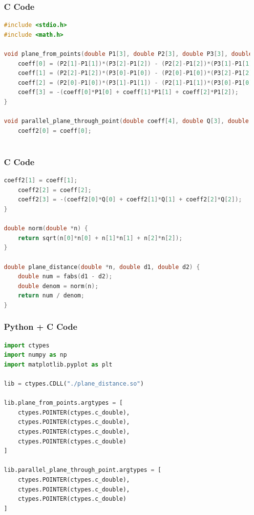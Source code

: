 \documentclass{beamer}
\begin{document}
\begin{frame}[fragile]
    \frametitle{C Code }
    \begin{lstlisting}[language=C]
#include <stdio.h>
#include <math.h>

void plane_from_points(double P1[3], double P2[3], double P3[3], double coeff[4]) {
    coeff[0] = (P2[1]-P1[1])*(P3[2]-P1[2]) - (P2[2]-P1[2])*(P3[1]-P1[1]);
    coeff[1] = (P2[2]-P1[2])*(P3[0]-P1[0]) - (P2[0]-P1[0])*(P3[2]-P1[2]);
    coeff[2] = (P2[0]-P1[0])*(P3[1]-P1[1]) - (P2[1]-P1[1])*(P3[0]-P1[0]);
    coeff[3] = -(coeff[0]*P1[0] + coeff[1]*P1[1] + coeff[2]*P1[2]);
}

void parallel_plane_through_point(double coeff[4], double Q[3], double coeff2[4]) {
    coeff2[0] = coeff[0];
    
    \end{lstlisting}
\end{frame}
\begin{frame}[fragile]
    \frametitle{C Code }
    \begin{lstlisting}[language=C]
coeff2[1] = coeff[1];
    coeff2[2] = coeff[2];
    coeff2[3] = -(coeff2[0]*Q[0] + coeff2[1]*Q[1] + coeff2[2]*Q[2]);
}

double norm(double *n) {
    return sqrt(n[0]*n[0] + n[1]*n[1] + n[2]*n[2]);
}

double plane_distance(double *n, double d1, double d2) {
    double num = fabs(d1 - d2);
    double denom = norm(n);
    return num / denom;
}
     \end{lstlisting}
\end{frame}
\begin{frame}[fragile]
    \frametitle{Python + C Code }
    \begin{lstlisting}[language=Python]
import ctypes
import numpy as np
import matplotlib.pyplot as plt

lib = ctypes.CDLL("./plane_distance.so")  

lib.plane_from_points.argtypes = [
    ctypes.POINTER(ctypes.c_double),
    ctypes.POINTER(ctypes.c_double),
    ctypes.POINTER(ctypes.c_double),
    ctypes.POINTER(ctypes.c_double)
]

lib.parallel_plane_through_point.argtypes = [
    ctypes.POINTER(ctypes.c_double),
    ctypes.POINTER(ctypes.c_double),
    ctypes.POINTER(ctypes.c_double)
]
    \end{lstlisting}
\end{frame}
\end{document}
